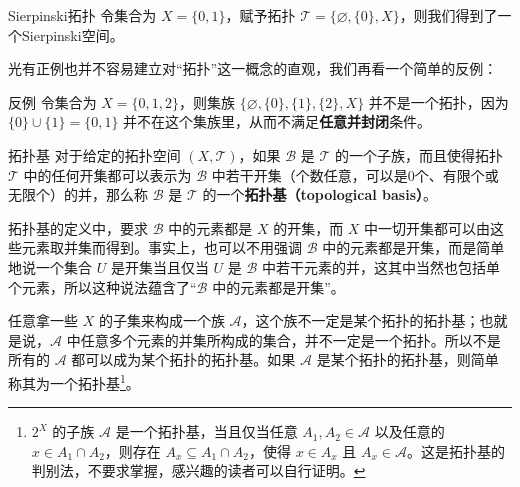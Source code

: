 
\begin{example}{Sierpinski拓扑}
令集合为 $X=\{0, 1\}$，赋予拓扑 $\mathcal{T}=\{\varnothing, \{0\}, X\}$，则我们得到了一个Sierpinski空间。
\end{example}


光有正例也并不容易建立对“拓扑”这一概念的直观，我们再看一个简单的反例：

\begin{example}{反例}
令集合为 $X=\{0, 1, 2\}$，则集族 $\{\varnothing, \{0\},\{1\},\{2\}, X\}$ 并不是一个拓扑，因为 $\{0\}\cup\{1\}=\{0,1\}$ 并不在这个集族里，从而不满足\textbf{任意并封闭}条件。
\end{example}

\begin{definition}{拓扑基}\label{def_Topol_2}
对于给定的拓扑空间 $(X, \mathcal{T})$，如果 $\mathcal{B}$ 是 $\mathcal{T}$ 的一个子族，而且使得拓扑 $\mathcal{T}$ 中的任何开集都可以表示为 $\mathcal{B}$ 中若干开集（个数任意，可以是0个、有限个或无限个）的并，那么称 $\mathcal{B}$ 是 $\mathcal{T}$ 的一个\textbf{拓扑基（topological basis）}。
\end{definition}

拓扑基的定义中，要求 $\mathcal{B}$ 中的元素都是 $X$ 的开集，而 $X$ 中一切开集都可以由这些元素取并集而得到。事实上，也可以不用强调
$\mathcal{B}$ 中的元素都是开集，而是简单地说一个集合 $U$ 是开集当且仅当 $U$ 是 $\mathcal{B}$ 中若干元素的并，这其中当然也包括单个元素，所以这种说法蕴含了“$\mathcal{B}$ 中的元素都是开集”。

任意拿一些 $X$ 的子集来构成一个族 $\mathcal{A}$，这个族不一定是某个拓扑的拓扑基；也就是说，$\mathcal{A}$ 中任意多个元素的并集所构成的集合，并不一定是一个拓扑。所以不是所有的 $\mathcal{A}$ 都可以成为某个拓扑的拓扑基。如果 $\mathcal{A}$ 是某个拓扑的拓扑基，则简单称其为一个拓扑基\footnote{$2^X$ 的子族 $\mathcal{A}$ 是一个拓扑基，当且仅当任意 $A_1, A_2\in\mathcal{A}$ 以及任意的 $x\in A_1\cap A_2$，则存在 $A_x\subseteq A_1\cap A_2$，使得 $x\in A_x$ 且 $A_x\in \mathcal{A}$。这是拓扑基的判别法，不要求掌握，感兴趣的读者可以自行证明。}。


